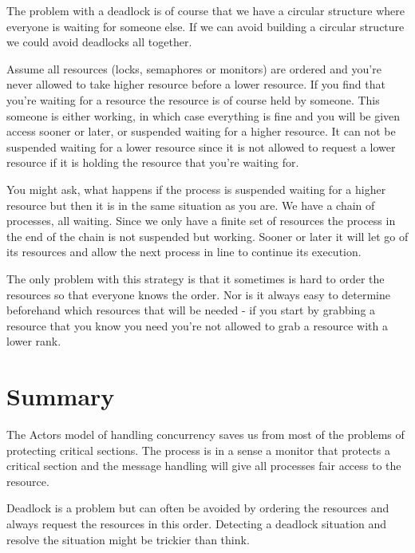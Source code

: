 \documentclass[a4paper,11pt]{article}
\begin{document}
The problem with a deadlock is of course that we have a circular
structure where everyone is waiting for someone else. If we can avoid
building a circular structure we could avoid deadlocks all together.

Assume all resources (locks, semaphores or monitors) are ordered and
you're never allowed to take higher resource before a lower
resource. If you find that you're waiting for a resource the resource
is of course held by someone. This someone is either working, in which
case everything is fine and you will be given access sooner or later,
or suspended waiting for a higher resource. It can not be suspended
waiting for a lower resource since it is not allowed to request a
lower resource if it is holding the resource that you're waiting for.

You might ask, what happens if the process is suspended waiting for a
higher resource but then it is in the same situation as you are. We
have a chain of processes, all waiting. Since we only have a finite
set of resources the process in the end of the chain is not suspended
but working. Sooner or later it will let go of its resources and allow
the next process in line to continue its execution.

The only problem with this strategy is that it sometimes is hard to
order the resources so that everyone knows the order. Nor is it always
easy to determine beforehand which resources that will be needed - if
you start by grabbing a resource that you know you need you're not
allowed to grab a resource with a lower rank.




\section{Summary}

The Actors model of handling concurrency saves us from most of the
problems of protecting critical sections. The process is in a sense a
monitor that protects a critical section and the message handling will
give all processes fair access to the resource.

Deadlock is a problem but can often be avoided by ordering the
resources and always request the resources in this order. Detecting a
deadlock situation and resolve the situation might be trickier than
think. 
\end{document}
